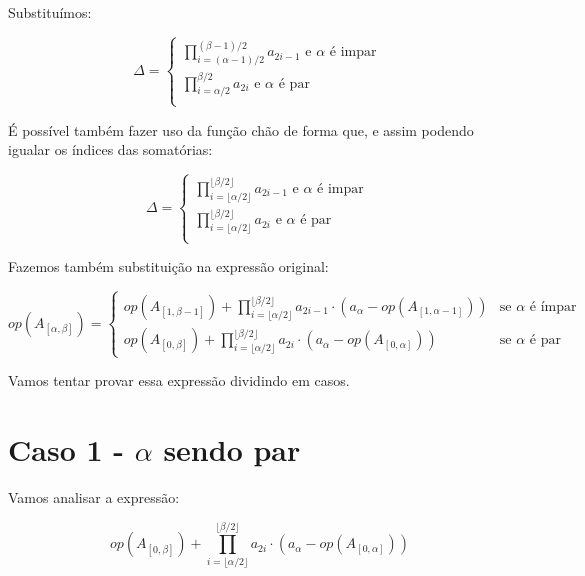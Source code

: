 \documentclass{article}
\begin{document}
Substituímos:

\begin{equation*}
\Delta = \begin{cases}
 \prod_{i=(\alpha-1)/2}^{(\beta-1)/2} a_{2i-1} \text{ e } \alpha \text{ é impar } \\
\prod_{i=\alpha/2}^{\beta/2} a_{2i}  \text{ e } \alpha \text{ é par } \\
\end{cases}
\end{equation*}

É possível também fazer uso da função chão de forma que, e assim podendo igualar os índices das somatórias:

\begin{equation*}
\Delta = \begin{cases}
 \prod_{i=\lfloor\alpha/2\rfloor}^{\lfloor\beta/2\rfloor} a_{2i-1} \text{ e } \alpha \text{ é impar } \\
\prod_{i=\lfloor\alpha/2\rfloor}^{\lfloor\beta/2\rfloor} a_{2i}  \text{ e } \alpha \text{ é par } \\
\end{cases}
\end{equation*}

Fazemos também substituição na expressão original:

\begin{equation*}
op(A_{[\alpha, \beta]}) = \begin{cases}
op(A_{[1,\beta-1]}) + \prod_{i=\lfloor\alpha/2\rfloor}^{\lfloor\beta/2\rfloor} a_{2i-1} \cdot (a_\alpha - op(A_{[1,\alpha-1]})) & \text{se } \alpha \text{ é ímpar} \\
op(A_{[0,\beta]}) + \prod_{i=\lfloor\alpha/2\rfloor}^{\lfloor\beta/2\rfloor} a_{2i} \cdot (a_\alpha - op(A_{[0,\alpha]})) & \text{se } \alpha \text{ é par}
\end{cases}
\end{equation*}

Vamos tentar provar essa expressão dividindo em casos.

\section*{Caso 1 - $\alpha$ sendo par}

Vamos analisar a expressão:

\begin{equation*}
op(A_{[0,\beta]}) + \prod_{i=\lfloor\alpha/2\rfloor}^{\lfloor\beta/2\rfloor} a_{2i} \cdot (a_\alpha - op(A_{[0,\alpha]})) 
\end{equation*}
\end{document}
